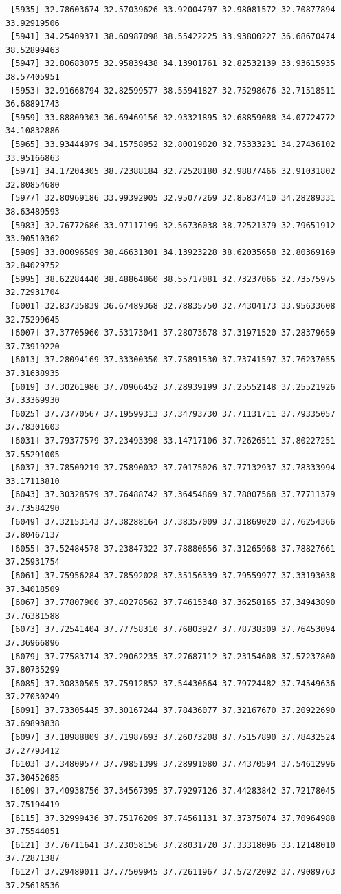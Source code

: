 \documentclass[
  letterpaper,
  DIV=11,
  numbers=noendperiod]{scrartcl}
\begin{document}
\begin{verbatim}
 [5935] 32.78603674 32.57039626 33.92004797 32.98081572 32.70877894 33.92919506
 [5941] 34.25409371 38.60987098 38.55422225 33.93800227 36.68670474 38.52899463
 [5947] 32.80683075 32.95839438 34.13901761 32.82532139 33.93615935 38.57405951
 [5953] 32.91668794 32.82599577 38.55941827 32.75298676 32.71518511 36.68891743
 [5959] 33.88809303 36.69469156 32.93321895 32.68859088 34.07724772 34.10832886
 [5965] 33.93444979 34.15758952 32.80019820 32.75333231 34.27436102 33.95166863
 [5971] 34.17204305 38.72388184 32.72528180 32.98877466 32.91031802 32.80854680
 [5977] 32.80969186 33.99392905 32.95077269 32.85837410 34.28289331 38.63489593
 [5983] 32.76772686 33.97117199 32.56736038 38.72521379 32.79651912 33.90510362
 [5989] 33.00096589 38.46631301 34.13923228 38.62035658 32.80369169 32.84029752
 [5995] 38.62284440 38.48864860 38.55717081 32.73237066 32.73575975 32.72931704
 [6001] 32.83735839 36.67489368 32.78835750 32.74304173 33.95633608 32.75299645
 [6007] 37.37705960 37.53173041 37.28073678 37.31971520 37.28379659 37.73919220
 [6013] 37.28094169 37.33300350 37.75891530 37.73741597 37.76237055 37.31638935
 [6019] 37.30261986 37.70966452 37.28939199 37.25552148 37.25521926 37.33369930
 [6025] 37.73770567 37.19599313 37.34793730 37.71131711 37.79335057 37.78301603
 [6031] 37.79377579 37.23493398 33.14717106 37.72626511 37.80227251 37.55291005
 [6037] 37.78509219 37.75890032 37.70175026 37.77132937 37.78333994 33.17113810
 [6043] 37.30328579 37.76488742 37.36454869 37.78007568 37.77711379 37.73584290
 [6049] 37.32153143 37.38288164 37.38357009 37.31869020 37.76254366 37.80467137
 [6055] 37.52484578 37.23847322 37.78880656 37.31265968 37.78827661 37.25931754
 [6061] 37.75956284 37.78592028 37.35156339 37.79559977 37.33193038 37.34018509
 [6067] 37.77807900 37.40278562 37.74615348 37.36258165 37.34943890 37.76381588
 [6073] 37.72541404 37.77758310 37.76803927 37.78738309 37.76453094 37.36966896
 [6079] 37.77583714 37.29062235 37.27687112 37.23154608 37.57237800 37.80735299
 [6085] 37.30830505 37.75912852 37.54430664 37.79724482 37.74549636 37.27030249
 [6091] 37.73305445 37.30167244 37.78436077 37.32167670 37.20922690 37.69893838
 [6097] 37.18988809 37.71987693 37.26073208 37.75157890 37.78432524 37.27793412
 [6103] 37.34809577 37.79851399 37.28991080 37.74370594 37.54612996 37.30452685
 [6109] 37.40938756 37.34567395 37.79297126 37.44283842 37.72178045 37.75194419
 [6115] 37.32999436 37.75176209 37.74561131 37.37375074 37.70964988 37.75544051
 [6121] 37.76711641 37.23058156 37.28031720 37.33318096 33.12148010 37.72871387
 [6127] 37.29489011 37.77509945 37.72611967 37.57272092 37.79089763 37.25618536

\end{verbatim}
\end{document}
